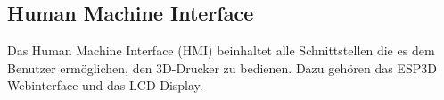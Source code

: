\subsection{Human Machine Interface}
\label{sec:HumanMachineInterface}

Das Human Machine Interface (HMI) beinhaltet alle Schnittstellen die es dem Benutzer ermöglichen, den 3D-Drucker zu bedienen.
Dazu gehören das ESP3D Webinterface und das LCD-Display.